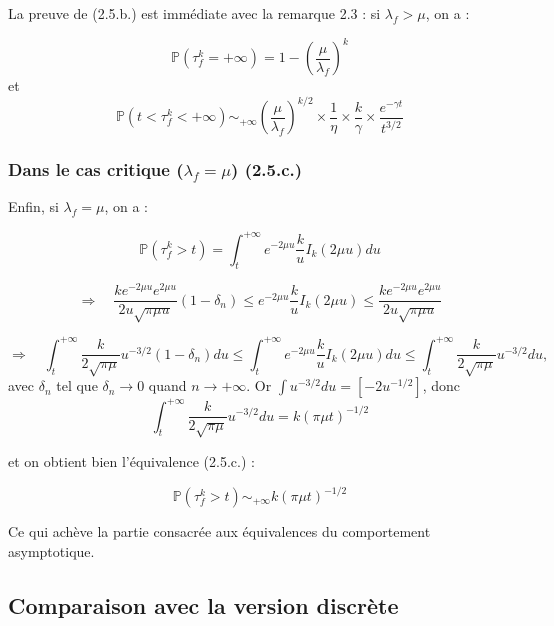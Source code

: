 \documentclass[12pt,a4paper]{article}
\begin{document}
La preuve de (2.5.b.) est immédiate avec la remarque 2.3 : si $\lambda_f > \mu$, on a :

$$ \mathbb{P}(\tau_f^k = +\infty) = 1 - \left(\frac{\mu}{\lambda_f}\right)^k$$
et 
$$ \boxed{\mathbb{P}(t < \tau_f^k < +\infty) \sim_{+\infty} \left(\frac{\mu}{\lambda_f}\right)^{k/2} \times \frac{1}{\eta} \times \frac{k}{\gamma} \times \frac{e^{-\gamma t}}{t^{3/2}}} $$

\subsubsection{Dans le cas critique (\texorpdfstring{$\lambda_f = \mu$}{}) (2.5.c.)}

Enfin, si $\lambda_f = \mu$, on a : 

$$ \mathbb{P}(\tau_f^k > t) = \int_t^{+\infty} e^{-2\mu u}\frac{k}{u} I_k(2\mu u) du $$

$$ \Rightarrow \quad \frac{k e^{-2\mu u} e^{2\mu u}}{2 u \sqrt{\pi \mu u}} (1 - \delta_n) \leq e^{-2\mu u} \frac{k}{u} I_k(2\mu u) \leq  \frac{k e^{-2\mu u} e^{2\mu u}}{2 u \sqrt{\pi \mu u}} $$ 

$$ \Rightarrow \quad \int_t^{+\infty} \frac{k}{2\sqrt{\pi \mu}} u^{-3/2} (1 - \delta_n)du \leq \int_t^{+\infty}  e^{-2\mu u} \frac{k}{u} I_k(2\mu u) du \leq  \int_t^{+\infty}  \frac{k}{2\sqrt{\pi \mu}} u^{-3/2} du, $$ avec $\delta_n$ tel que $\delta_n \longrightarrow 0$ quand $n \rightarrow +\infty$. Or $\int u^{-3/2} du = [-2u^{-1/2}]$, 
donc $$ \int_t^{+\infty} \frac{k}{2\sqrt{\pi \mu}} u^{-3/2} du = k(\pi \mu t)^{-1/2} $$

et on obtient bien l'équivalence (2.5.c.) : 

$$ \boxed{\mathbb{P}(\tau_f^k > t) \sim_{+\infty} k (\pi \mu t)^{-1/2}} $$ 

Ce qui achève la partie consacrée aux équivalences du comportement asymptotique.

\subsection{Comparaison avec la version discrète}
\end{document}
